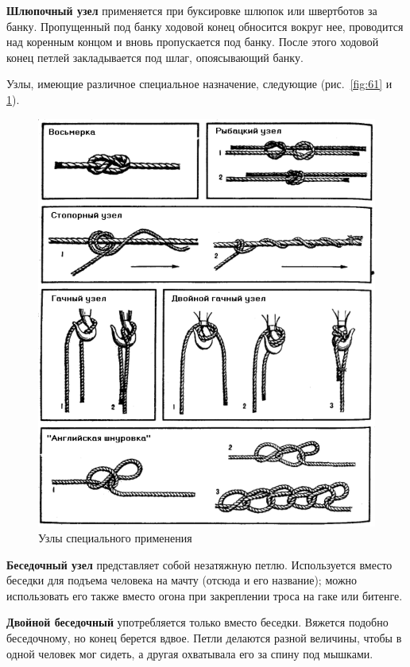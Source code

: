 \documentclass[a4paper, 12pt, twoside, final]{scrbook}
\begin{document}
\textbf{Шлюпочный узел} применяется при буксировке шлюпок или швертботов за банку. Пропущенный под банку ходовой конец обносится вокруг нее, проводится над коренным концом и вновь пропускается под банку. После этого ходовой конец петлей закладывается под шлаг, опоясывающий банку.

Узлы, имеющие различное специальное назначение, следующие (рис.~\ref{fig:61} и \ref{fig:62}).

\begin{figure}[htbp]
   \centering
   \includegraphics{62_Uzly} %
   \caption{Узлы специального применения}
   \label{fig:62}
\end{figure}

\textbf{Беседочный узел} представляет собой незатяжную петлю. Используется вместо беседки для подъема человека на мачту (отсюда и его название); можно использовать его также вместо огона при закреплении троса на гаке или битенге.

\textbf{Двойной беседочный} употребляется только вместо беседки. Вяжется подобно беседочному, но конец берется вдвое. Петли делаются разной величины, чтобы в одной человек мог сидеть, а другая охватывала его за спину под мышками.
\end{document}
